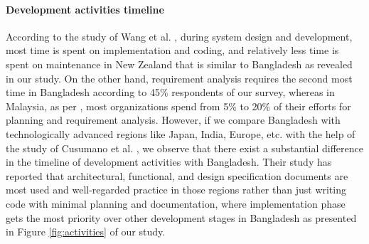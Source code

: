 \paragraph{Development activities timeline}
According to the study of Wang et al. \cite{Wang2018}, during system design and development, most time is spent on implementation and coding, and relatively less time is spent on maintenance in New Zealand that is similar to Bangladesh as revealed in our study. On the other hand, requirement analysis requires the second most time in Bangladesh according to 45\% respondents of our survey, whereas in Malaysia, as per \cite{Baharom2006}, most organizations spend from 5\% to 20\% of their efforts for planning and requirement analysis. However, if we compare Bangladesh with technologically advanced regions like Japan, India, Europe, etc. with the help of the study of Cusumano et al. \cite{Cusumano2003}, we observe that there exist a substantial difference in the timeline of development activities with Bangladesh. Their study has reported that architectural, functional, and design specification documents are most used and well-regarded practice in those regions rather than just writing code with minimal planning and documentation, where implementation phase gets the most priority over other development stages in Bangladesh as presented in Figure \ref{fig:activities} of our study.  
